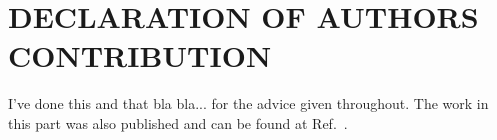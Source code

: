 \chapter*{DECLARATION OF AUTHORS CONTRIBUTION}
%
I've done this and that bla bla...
for the advice given throughout. The work in this part was also published and can be found at Ref.~\cite{Aaij:2015xza}.

%
\clearpage
